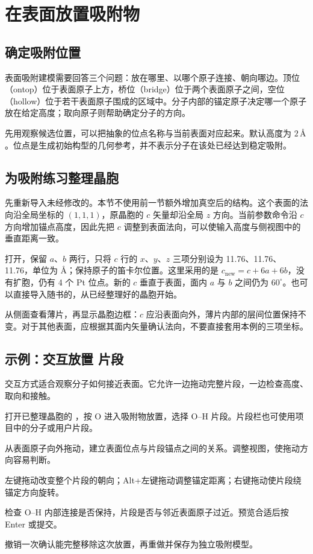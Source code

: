 

\section{在表面放置吸附物}

\subsection{确定吸附位置}

表面吸附建模需要回答三个问题：放在哪里、以哪个原子连接、朝向哪边。顶位（ontop）位于表面原子上方，桥位（bridge）位于两个表面原子之间，空位（hollow）位于若干表面原子围成的区域中。分子内部的锚定原子决定哪一个原子放在给定高度；取向原子则帮助确定分子的方向。

先用观察候选位置，可以把抽象的位点名称与当前表面对应起来。默认高度为 $2\,\text{\AA}$。位点是生成初始构型的几何参考，并不表示分子在该处已经达到稳定吸附。

\subsection{为吸附练习整理晶胞}

先重新导入未经修改的。本节不使用前一节额外增加真空后的结构。这个表面的法向沿全局坐标的 $(1,1,1)$，原晶胞的 $c$ 矢量却沿全局 $z$ 方向。当前参数命令沿 $c$ 方向增加锚点高度，因此先把 $c$ 调整到表面法向，可以使输入高度与侧视图中的垂直距离一致。

打开，保留 $a$、$b$ 两行，只将 $c$ 行的 $x$、$y$、$z$ 三项分别设为 11.76、11.76、11.76，单位为 \AA；保持原子的笛卡尔位置。这里采用的是 $c_{\mathrm{new}}=c+6a+6b$，没有扩胞，仍有 4 个 Pt 位点。新的 $c$ 垂直于表面，面内 $a$ 与 $b$ 之间仍为 $60^\circ$。也可以直接导入随书的，从已经整理好的晶胞开始。

从侧面查看薄片，再显示晶胞边框：$c$ 应沿表面向外，薄片内部的层间位置保持不变。对于其他表面，应根据其面内矢量确认法向，不要直接套用本例的三项坐标。

\subsection{示例：交互放置  片段}

交互方式适合观察分子如何接近表面。它允许一边拖动完整片段，一边检查高度、取向和接触。

\begin{steps}
  \item 打开已整理晶胞的 ，按 O 进入吸附物放置，选择 O--H 片段。片段栏也可使用项目中的分子或用户片段。
  \item 从表面原子向外拖动，建立表面位点与片段锚点之间的关系。调整视图，使拖动方向容易判断。
  \item 左键拖动改变整个片段的朝向；Alt+左键拖动调整锚定距离；右键拖动使片段绕锚定方向旋转。
  \item 检查 O--H 内部连接是否保持，片段是否与邻近表面原子过近。预览合适后按 Enter 或提交。
  \item 撤销一次确认能完整移除这次放置，再重做并保存为独立吸附模型。
\end{steps}


